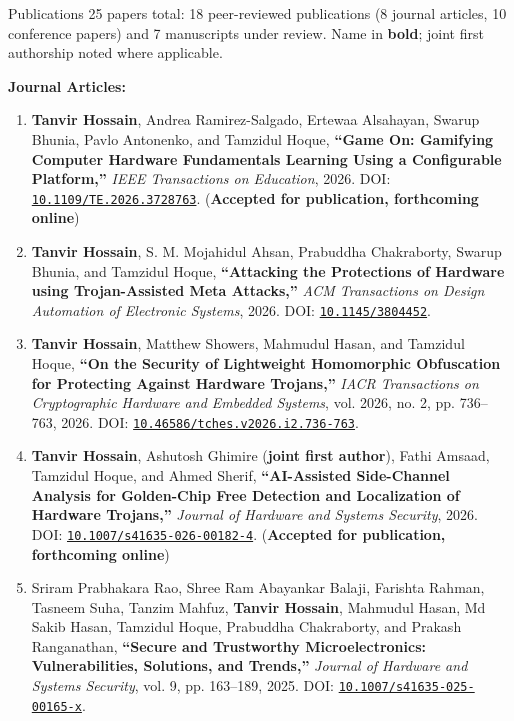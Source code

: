 \begin{rSection}{Publications}
\newcommand{\doi}[1]{DOI: \href{https://doi.org/#1}{\nolinkurl{#1}}}
\vspace{0.1cm}
25 papers total: 18 peer-reviewed publications (8 journal articles, 10 conference papers) and 7 manuscripts under review. Name in \textbf{bold}; joint first authorship noted where applicable.
\vspace{0.15cm}

\textbf{Journal Articles:}
\vspace{-0.25cm}

\begin{enumerate}
    \item \textbf{Tanvir Hossain}, Andrea Ramirez-Salgado, Ertewaa Alsahayan, Swarup Bhunia, Pavlo Antonenko, and Tamzidul Hoque, \textbf{``Game On: Gamifying Computer Hardware Fundamentals Learning Using a Configurable Platform,''} \emph{IEEE Transactions on Education}, 2026. \doi{10.1109/TE.2026.3728763}. (\textbf{Accepted for publication, forthcoming online})

    \item \textbf{Tanvir Hossain}, S. M. Mojahidul Ahsan, Prabuddha Chakraborty, Swarup Bhunia, and Tamzidul Hoque, \textbf{``Attacking the Protections of Hardware using Trojan-Assisted Meta Attacks,''} \emph{ACM Transactions on Design Automation of Electronic Systems}, 2026. \doi{10.1145/3804452}.

    \item \textbf{Tanvir Hossain}, Matthew Showers, Mahmudul Hasan, and Tamzidul Hoque, \textbf{``On the Security of Lightweight Homomorphic Obfuscation for Protecting Against Hardware Trojans,''} \emph{IACR Transactions on Cryptographic Hardware and Embedded Systems}, vol. 2026, no. 2, pp. 736--763, 2026. \doi{10.46586/tches.v2026.i2.736-763}.

    \item \textbf{Tanvir Hossain}, Ashutosh Ghimire (\textbf{joint first author}), Fathi Amsaad, Tamzidul Hoque, and Ahmed Sherif, \textbf{``AI-Assisted Side-Channel Analysis for Golden-Chip Free Detection and Localization of Hardware Trojans,''} \emph{Journal of Hardware and Systems Security}, 2026. \doi{10.1007/s41635-026-00182-4}. (\textbf{Accepted for publication, forthcoming online})

    \item Sriram Prabhakara Rao, Shree Ram Abayankar Balaji, Farishta Rahman, Tasneem Suha, Tanzim Mahfuz, \textbf{Tanvir Hossain}, Mahmudul Hasan, Md Sakib Hasan, Tamzidul Hoque, Prabuddha Chakraborty, and Prakash Ranganathan, \textbf{``Secure and Trustworthy Microelectronics: Vulnerabilities, Solutions, and Trends,''} \emph{Journal of Hardware and Systems Security}, vol. 9, pp. 163--189, 2025. \doi{10.1007/s41635-025-00165-x}.


\end{enumerate}
\end{rSection}
